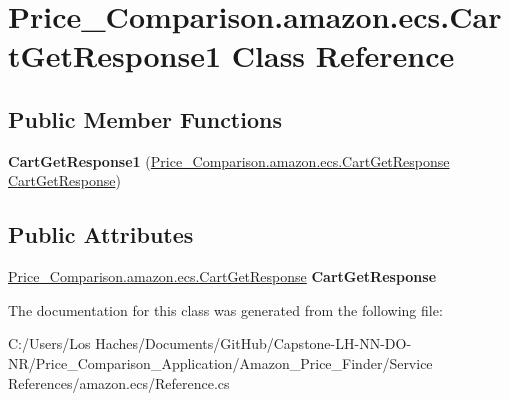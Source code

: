 \hypertarget{class_price___comparison_1_1amazon_1_1ecs_1_1_cart_get_response1}{\section{Price\-\_\-\-Comparison.\-amazon.\-ecs.\-Cart\-Get\-Response1 Class Reference}
\label{class_price___comparison_1_1amazon_1_1ecs_1_1_cart_get_response1}
}
\subsection*{Public Member Functions}
\begin{DoxyCompactItemize}
\item 
\hypertarget{class_price___comparison_1_1amazon_1_1ecs_1_1_cart_get_response1_aa636906315aef26ea3d9a21b06ec3302}{{\bfseries Cart\-Get\-Response1} (\hyperlink{class_price___comparison_1_1amazon_1_1ecs_1_1_cart_get_response}{Price\-\_\-\-Comparison.\-amazon.\-ecs.\-Cart\-Get\-Response} \hyperlink{class_price___comparison_1_1amazon_1_1ecs_1_1_cart_get_response}{Cart\-Get\-Response})}\label{class_price___comparison_1_1amazon_1_1ecs_1_1_cart_get_response1_aa636906315aef26ea3d9a21b06ec3302}

\end{DoxyCompactItemize}
\subsection*{Public Attributes}
\begin{DoxyCompactItemize}
\item 
\hypertarget{class_price___comparison_1_1amazon_1_1ecs_1_1_cart_get_response1_a593f5cc4611e4293c7e2ea81b1baf696}{\hyperlink{class_price___comparison_1_1amazon_1_1ecs_1_1_cart_get_response}{Price\-\_\-\-Comparison.\-amazon.\-ecs.\-Cart\-Get\-Response} {\bfseries Cart\-Get\-Response}}\label{class_price___comparison_1_1amazon_1_1ecs_1_1_cart_get_response1_a593f5cc4611e4293c7e2ea81b1baf696}

\end{DoxyCompactItemize}


The documentation for this class was generated from the following file\-:\begin{DoxyCompactItemize}
\item 
C\-:/\-Users/\-Los Haches/\-Documents/\-Git\-Hub/\-Capstone-\/\-L\-H-\/\-N\-N-\/\-D\-O-\/\-N\-R/\-Price\-\_\-\-Comparison\-\_\-\-Application/\-Amazon\-\_\-\-Price\-\_\-\-Finder/\-Service References/amazon.\-ecs/Reference.\-cs\end{DoxyCompactItemize}
